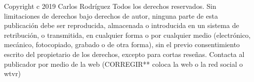 Copyright c 2019 Carlos Rodríguez
Todos los derechos reservados. Sin limitaciones de derechos bajo derechos de autor, ninguna parte de esta publicación debe ser reproducida, almacenada o introducida en un sistema de retribución, o transmitida, en cualquier forma o por cualquier medio (electrónico, mecánico, fotocopiado, grabado o de otra forma), sin el previo consentimiento escrito del propietario de los derechos, excepto para cortas reseñas.
Contacta al publicador por medio de la web (CORREGIR** coloca la web o la red social o wtvr)
